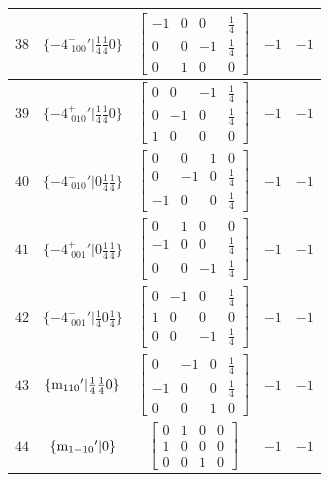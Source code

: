 \documentclass[fleqn,8pt]{jsarticle}
\begin{document}
\begin{longtable}{ccccc}
$ 38 $ & $ \{-4^{-}_{\,\,100}{}'|\frac{1}{4} \frac{1}{4} 0\} $ & $ \begin{bmatrix} -1 & 0 & 0 & \frac{1}{4} \\ 0 & 0 & -1 & \frac{1}{4} \\ 0 & 1 & 0 & 0 \end{bmatrix} $ & $ -1 $ & $ -1 $ \\ \hline
$ 39 $ & $ \{-4^{+}_{\,\,010}{}'|\frac{1}{4} \frac{1}{4} 0\} $ & $ \begin{bmatrix} 0 & 0 & -1 & \frac{1}{4} \\ 0 & -1 & 0 & \frac{1}{4} \\ 1 & 0 & 0 & 0 \end{bmatrix} $ & $ -1 $ & $ -1 $ \\ \hline
$ 40 $ & $ \{-4^{-}_{\,\,010}{}'|0 \frac{1}{4} \frac{1}{4}\} $ & $ \begin{bmatrix} 0 & 0 & 1 & 0 \\ 0 & -1 & 0 & \frac{1}{4} \\ -1 & 0 & 0 & \frac{1}{4} \end{bmatrix} $ & $ -1 $ & $ -1 $ \\ \hline
$ 41 $ & $ \{-4^{+}_{\,\,001}{}'|0 \frac{1}{4} \frac{1}{4}\} $ & $ \begin{bmatrix} 0 & 1 & 0 & 0 \\ -1 & 0 & 0 & \frac{1}{4} \\ 0 & 0 & -1 & \frac{1}{4} \end{bmatrix} $ & $ -1 $ & $ -1 $ \\ \hline
$ 42 $ & $ \{-4^{-}_{\,\,001}{}'|\frac{1}{4} 0 \frac{1}{4}\} $ & $ \begin{bmatrix} 0 & -1 & 0 & \frac{1}{4} \\ 1 & 0 & 0 & 0 \\ 0 & 0 & -1 & \frac{1}{4} \end{bmatrix} $ & $ -1 $ & $ -1 $ \\ \hline
$ 43 $ & $ \{{\rm m}_{110}{}'|\frac{1}{4} \frac{1}{4} 0\} $ & $ \begin{bmatrix} 0 & -1 & 0 & \frac{1}{4} \\ -1 & 0 & 0 & \frac{1}{4} \\ 0 & 0 & 1 & 0 \end{bmatrix} $ & $ -1 $ & $ -1 $ \\ \hline
$ 44 $ & $ \{{\rm m}_{1-10}{}'|0\} $ & $ \begin{bmatrix} 0 & 1 & 0 & 0 \\ 1 & 0 & 0 & 0 \\ 0 & 0 & 1 & 0 \end{bmatrix} $ & $ -1 $ & $ -1 $ \\ \hline

\end{longtable}
\end{document}
